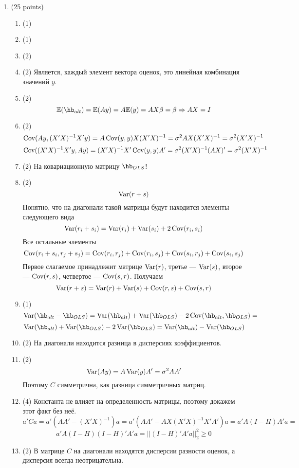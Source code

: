 \documentclass[12pt, a4paper]{article}
\theoremstyle{definition}
\begin{document}
\begin{enumerate}

\item (25 points)
\begin{enumerate}
  \item (1)
  \item (1)
  \item (2)
  \item (2) Является, каждый элемент вектора оценок, это линейная комбинация значений $y$.
  \item (2)
\[
\E (\hb_{alt}) = \E (Ay) = A\E(y) = AX\beta = \beta \Rightarrow AX = I
\]
  \item (2)
\[
\operatorname{Cov} (Ay, (X'X)^{-1}X'y) = A  \operatorname{Cov}(y, y) X (X'X)^{-1} = \sigma^2 AX(X'X)^{-1} = \sigma^2 (X'X)^{-1}
\]
\[
\operatorname{Cov} ((X'X)^{-1}X'y, Ay) = (X'X)^{-1}X' \operatorname{Cov}(y, y) A' = \sigma^2 (X'X)^{-1} (AX)' = \sigma^2 (X'X)^{-1}
\]
  \item (2)
На ковариационную матрицу $\hb_{OLS}$!
  \item (2)
\[
\operatorname{Var} (r + s)
\]
Понятно, что на диагонали такой матрицы будут находится элементы следующего вида
\[
\operatorname{Var}(r_i + s_i) = \operatorname{Var} (r_i) + \operatorname{Var} (s_i) + 2\operatorname{Cov} (r_i, s_i)
\]
Все остальные элементы
\[
\operatorname{Cov}(r_i + s_i, r_j + s_j) = \operatorname{Cov}(r_i, r_j) + \operatorname{Cov}(r_i, s_j) +  \operatorname{Cov}(s_i, r_j) +  \operatorname{Cov}(s_i, s_j)
\]
Первое слагаемое принадлежит матрице $\operatorname{Var} (r)$, третье — $\operatorname{Var}(s)$, второе — $\operatorname{Cov}(r,s)$, четвертое — $\operatorname{Cov}(s,r)$. Получаем
\[
\operatorname{Var}(r + s) = \operatorname{Var}(r) + \operatorname{Var} (s) + \operatorname{Cov}(r,s) + \operatorname{Cov}(s,r)
\]
  \item (1)
\[
\Var (\hb_{alt} - \hb_{OLS}) = \Var(\hb_{alt}) + \Var(\hb_{OLS}) - 2\Cov (\hb_{alt}, \hb_{OLS}) =
\]
\[
\Var(\hb_{alt}) + \Var(\hb_{OLS}) - 2\Var(\hb_{OLS}) = \Var(\hb_{alt}) - \Var(\hb_{OLS})
\]
  \item (2)
На диагонали находится разница в дисперсиях коэффициентов.
  \item (2)
\[
\operatorname{Var} (Ay) = A \operatorname{Var}(y) A' = \sigma^2 AA'
\]
Поэтому $C$ симметрична,  как разница симметричных матриц.

  \item (4)
Константа не влияет на определенность матрицы, поэтому докажем этот факт без неё.
\[
a'Ca = a'(AA' - (X'X)^{-1})a = a'(AA' - AX(X'X)^{-1}X'A')a = a'A(I - H)A'a =
\]
\[
 a'A(I - H)(I - H)'A'a = ||(I - H)'A'a||^2_2 \geq 0
\]
  \item (2)
В матрице $C$ на диагонали находятся дисперсии разности оценок, а дисперсия всегда неотрицательна.
\end{enumerate}


\end{enumerate}
\end{document}
